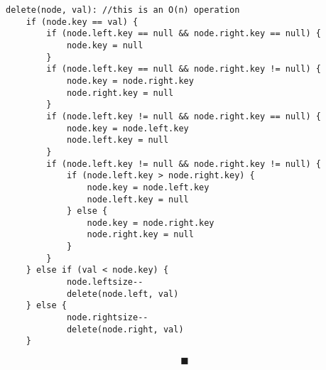 \documentclass[a4paper,12pt]{article}
\begin{document}
\begin{verbatim}
delete(node, val): //this is an O(n) operation
    if (node.key == val) { 
        if (node.left.key == null && node.right.key == null) {
            node.key = null
        }
        if (node.left.key == null && node.right.key != null) {    
            node.key = node.right.key
            node.right.key = null
        }
        if (node.left.key != null && node.right.key == null) {
            node.key = node.left.key
            node.left.key = null
        }
        if (node.left.key != null && node.right.key != null) {
            if (node.left.key > node.right.key) {
                node.key = node.left.key 
                node.left.key = null
            } else {
                node.key = node.right.key
                node.right.key = null
            }
        }         
    } else if (val < node.key) {
            node.leftsize--
            delete(node.left, val)    
    } else {
            node.rightsize--
            delete(node.right, val)
    }
\end{verbatim}

$$\blacksquare$$
\end{document}
